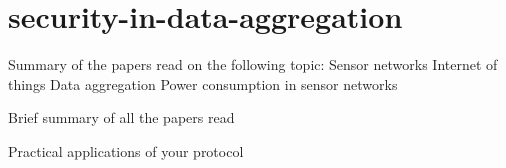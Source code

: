 \chapter{security-in-data-aggregation}

Summary of the papers read on the following topic:
	Sensor networks
	Internet of things
	Data aggregation
	Power consumption in sensor networks

Brief summary of all the papers read

Practical applications of your protocol